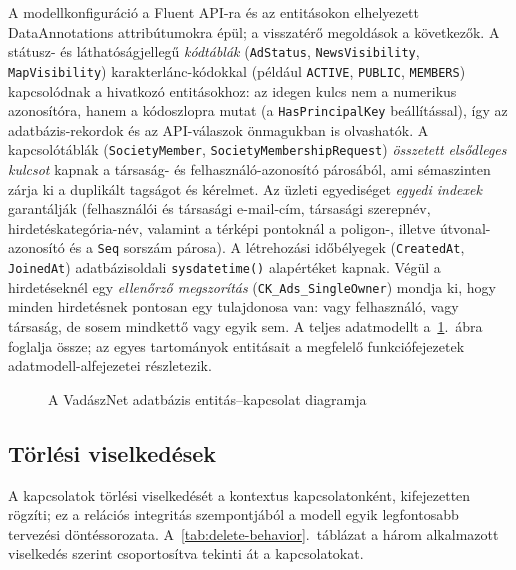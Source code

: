 A modellkonfiguráció a Fluent API-ra és az entitásokon elhelyezett DataAnnotations
attribútumokra épül; a visszatérő megoldások a következők.
A státusz- és láthatóságjellegű \emph{kódtáblák} (\texttt{AdStatus}, \texttt{NewsVisibility},
\texttt{MapVisibility}) karakterlánc-kódokkal (például \texttt{ACTIVE}, \texttt{PUBLIC},
\texttt{MEMBERS}) kapcsolódnak a hivatkozó entitásokhoz: az idegen kulcs nem a numerikus
azonosítóra, hanem a kódoszlopra mutat (a \texttt{HasPrincipalKey} beállítással), így az
adatbázis-rekordok és az API-válaszok önmagukban is olvashatók. A kapcsolótáblák
(\texttt{SocietyMember}, \texttt{SocietyMembershipRequest}) \emph{összetett elsődleges kulcsot}
kapnak a társaság- és felhasználó-azonosító párosából, ami sémaszinten zárja ki a duplikált
tagságot és kérelmet. Az üzleti egyediséget \emph{egyedi indexek} garantálják (felhasználói és
társasági e-mail-cím, társasági szerepnév, hirdetéskategória-név, valamint a térképi pontoknál a
poligon-, illetve útvonal-azonosító és a \texttt{Seq} sorszám párosa). A létrehozási időbélyegek
(\texttt{CreatedAt}, \texttt{JoinedAt}) adatbázisoldali \texttt{sysdatetime()} alapértéket kapnak.
Végül a hirdetéseknél egy \emph{ellenőrző megszorítás} (\texttt{CK\_Ads\_SingleOwner}) mondja ki,
hogy minden hirdetésnek pontosan egy tulajdonosa van: vagy felhasználó, vagy társaság, de sosem
mindkettő vagy egyik sem. A teljes adatmodellt a~\ref{fig:er-diagram}.~ábra foglalja össze; az
egyes tartományok entitásait a megfelelő funkciófejezetek adatmodell-alfejezetei részletezik.

\begin{figure}[htbp]
	\centering
	\caption{A VadászNet adatbázis entitás--kapcsolat diagramja}
	\label{fig:er-diagram}
\end{figure}

\subsection{Törlési viselkedések}

A kapcsolatok törlési viselkedését a kontextus kapcsolatonként, kifejezetten rögzíti; ez a
relációs integritás szempontjából a modell egyik legfontosabb tervezési döntéssorozata.
A~\ref{tab:delete-behavior}.~táblázat a három alkalmazott viselkedés szerint csoportosítva
tekinti át a kapcsolatokat.

